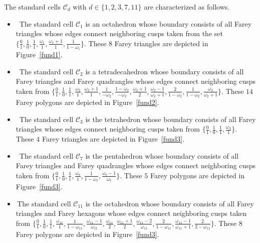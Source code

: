 \documentclass[graybox]{svmult}
\begin{document}
\begin{proposition}
The standard cells $\mathcal{C}_d$ with $d\in\{1,2,3,7,11\}$ are characterized as follows.
\begin{itemize}
\item[(i)]\, The standard cell $\mathcal{C}_1$ is an octahedron whose boundary consists of all Farey triangles whose edges connect neighboring cusps taken from the set $\big\{\frac01,\frac10,\frac11,\frac {\omega_1}1,\frac{\omega_1+1}1,\frac{1}{1-\omega_1}\big\}$. These $8$ Farey triangles are depicted in Figure~\ref{fund1}.

\item[(ii)]\, The standard cell $\mathcal{C}_2$ is a tetradecahedron whose boundary consists of all Farey triangles and Farey quadrangles whose edges connect neighboring cusps taken from 
$
\big\{\frac01,\frac10,\frac11,\frac{\omega_2}1,\frac{\omega_2+1}1,\frac{1}{-\omega_2},\frac{1-\omega_2}{-\omega_2},\frac{\omega_2+1}{2},\frac{\omega_2-1}{\omega_2+1},\frac{2}{1-\omega_2},\frac{1}{1-\omega_2},\frac{\omega_2}{\omega_2+1}\big\}.
$
These $14$ Farey polygons are depicted in Figure~\ref{fund2}.

\item[(iii)]~The standard cell $\mathcal{C}_3$ is the tetrahedron whose boundary consists of all Farey triangles whose edges connect neighboring cusps taken from $\big\{\frac01,\frac10,\frac11,\frac{\omega_3}{1}\big\}$. These $4$ Farey triangles are depicted in Figure~\ref{fund3}.

\item[(iv)]~The standard cell $\mathcal{C}_7$ is the pentahedron whose boundary consists of all Farey triangles and Farey quadrangles whose edges connect neighboring cusps taken from $\big\{\frac01,\frac10,\frac11,\frac{\omega_7}{1},\frac{1}{1-\omega_7},\frac{\omega_7-1}{\omega_7}\big\}$. 
These $5$ Farey polygons are depicted in Figure~\ref{fund3}.

\item[(v)]\,The standard cell $\mathcal{C}_{11}$ is the octahedron whose boundary consists of all Farey triangles and Farey hexagons whose edges connect neighboring cusps taken from
{
$
\big\{\frac01,\frac10,\frac11,\frac{\omega_{11}}{1},\frac{1}{1-\omega_{11}},\frac{\omega_{11}-1}{\omega_{11}},\frac{\omega_{11}}{2},\frac{\omega_{11}+1}{2},\frac{\omega_{11}-2}{\omega_{11}}, \frac{2}{1-\omega_{11}},\frac{\omega_{11}-1}{\omega_{11}+1},\frac{2}{2-\omega_{11}}\big\}. 
$
}
These $8$ Farey polygons are depicted in Figure~\ref{fund3}.
\end{itemize}
\end{proposition}
\end{document}
